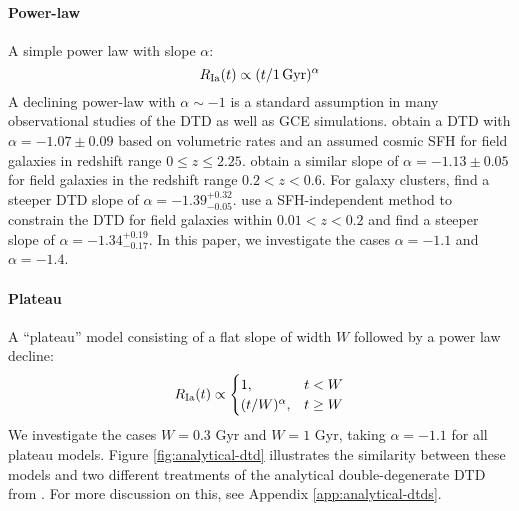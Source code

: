 \documentclass[modern,linenumbers]{aastex631}
\begin{document}

\paragraph{Power-law} A simple power law with slope $\alpha$:
\begin{equation}
    R_{\rm Ia}(t) \propto (t/1\,\rm{Gyr})^\alpha
    \label{eq:powerlaw-dtd}
\end{equation}
A declining power-law with $\alpha\sim-1$ is a standard assumption in many observational studies of the DTD as well as GCE simulations. \citet{Maoz2017-CosmicDTD} obtain a DTD with $\alpha=-1.07\pm0.09$ based on volumetric rates and an assumed cosmic SFH for field galaxies in redshift range $0\leq z\leq 2.25$. \citet{Wiseman2021-DESRates} obtain a similar slope of $\alpha=-1.13\pm0.05$ for field galaxies in the redshift range $0.2<z<0.6$. For galaxy clusters, \citet{Maoz2017-CosmicDTD} find a steeper DTD slope of $\alpha=-1.39^{+0.32}_{-0.05}$. \citet{Heringer2019-FieldGalaxyDTD} use a SFH-independent method to constrain the DTD for field galaxies within $0.01<z<0.2$ and find a steeper slope of $\alpha=-1.34^{+0.19}_{-0.17}$.
In this paper, we investigate the cases $\alpha=-1.1$ and $\alpha=-1.4$.

\paragraph{Plateau} A ``plateau'' model consisting of a flat slope of width $W$ followed by a power law decline:
\begin{equation}
    R_{\rm Ia}(t) \propto
    \begin{cases}
        1, & t < W \\
        (t/W)^\alpha, & t \ge W
    \end{cases}
    \label{eq:plateau-dtd}
\end{equation}
We investigate the cases $W=0.3$ Gyr and $W=1$ Gyr, taking $\alpha=-1.1$ for all plateau models. Figure \ref{fig:analytical-dtd} illustrates the similarity between these models and two different treatments of the analytical double-degenerate DTD from \citet{Greggio2005-AnalyticalRates}. For more discussion on this, see Appendix \ref{app:analytical-dtds}.
\end{document}
